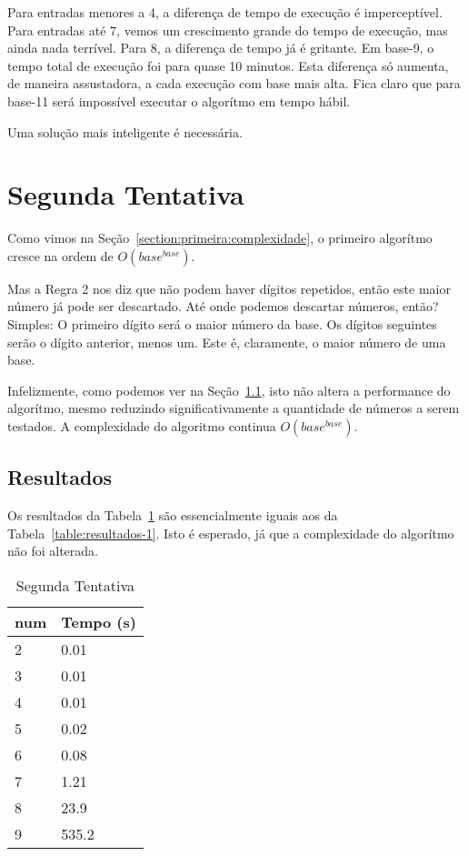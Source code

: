 \documentclass[12pt]{article}
\begin{document}
Para entradas menores a 4, a diferença de tempo de execução é imperceptível. Para entradas até 7, vemos um crescimento grande do tempo de execução, mas ainda nada terrível. Para 8, a diferença de tempo já é gritante. Em base-9, o tempo total de execução foi para quase 10 minutos. Esta diferença só aumenta, de maneira assustadora, a cada execução com base mais alta. Fica claro que para base-11 será impossível executar o algorítmo em tempo hábil.

Uma solução mais inteligente é necessária.

\section{Segunda Tentativa}\label{section:segunda}

Como vimos na Seção~\ref{section:primeira:complexidade}, o primeiro algorítmo cresce na ordem de $O(base^{base})$.

Mas a Regra 2 nos diz que não podem haver dígitos repetidos, então este maior número já pode ser descartado. Até onde podemos descartar números, então? Simples: O primeiro dígito será o maior número da base. Os dígitos seguintes serão o dígito anterior, menos um. Este é, claramente, o maior número de uma base.

Infelizmente, como podemos ver na Seção~\ref{section:segunda:resultados}, isto não altera a performance do algorítmo, mesmo reduzindo significativamente a quantidade de números a serem testados. A complexidade do algoritmo continua $O(base^{base})$.

\subsection{Resultados}\label{section:segunda:resultados}

Os resultados da Tabela~\ref{table:resultados-2} são essencialmente iguais aos da Tabela~\ref{table:resultados-1}. Isto é esperado, já que a complexidade do algorítmo não foi alterada.

\begin{table}[h]
\caption{Segunda Tentativa}
\label{table:resultados-2}
\begin{tabular}{ll}
  {\sf num} & Tempo (s) \\
  \hline
  2 & 0.01 \\
  3 & 0.01 \\
  4 & 0.01 \\
  5 & 0.02 \\
  6 & 0.08 \\
  7 & 1.21 \\
  8 & 23.9 \\
  9 & 535.2
  \end{tabular}
  \end{table}
\end{document}
